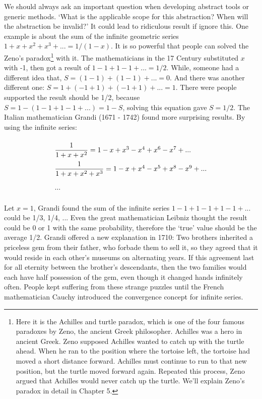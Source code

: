 \documentclass[b5paper]{article}
\begin{document}
We should always ask an important question when developing abstract tools or generic methods. `What is the applicable scope for this abstraction? When will the abstraction be invalid?' It could lead to ridiculous result if ignore this. One example is about the sum of the infinite geometric series $1 + x + x^2 + x^3 + ... = 1/(1-x)$. It is so powerful that people can solved the Zeno's paradox\footnote{Here it is the Achilles and turtle paradox, which is one of the four famous paradoxes by Zeno, the ancient Greek philosopher. Achilles was a hero in ancient Greek. Zeno supposed Achilles wanted to catch up with the turtle ahead. When he ran to the position where the tortoise left, the tortoise had moved a short distance forward. Achilles must continue to run to that new position, but the turtle moved forward again. Repeated this process, Zeno argued that Achilles would never catch up the turtle. We'll explain Zeno's paradox in detail in Chapter 5.} with it. The mathematicians in the 17 Century substituted $x$ with -1, then got a result of $1 - 1 + 1 - 1 + ... = 1/2$. While, someone had a different idea that, $S = (1 - 1) + (1 - 1)+ ... = 0$. And there was another different one: $S = 1 + (-1 + 1) + (-1 + 1) + ... = 1$. There were people supported the result should be 1/2, because $S = 1 - (1 - 1 + 1 - 1 + ...) = 1 -S$, solving this equation gave $S = 1/2$. The Italian mathematician Grandi (1671 - 1742) found more surprising results. By using the infinite series:

\[
\def\arraystretch{2.2}
\begin{array}{l}
\dfrac{1}{1 + x + x^2} = 1 - x + x^3 - x^4 + x^6 - x^7 + ... \\%
\dfrac{1}{1 + x + x^2 + x^3} = 1 - x + x^4 - x^5 + x^8 - x^9 + ... \\
...
\end{array}
\]

Let $x = 1$, Grandi found the sum of the infinite series $1 - 1 + 1 - 1 + 1 - 1 + ...$ could be 1/3, 1/4, ... Even the great mathematician Leibniz thought the result could be 0 or 1 with the same probability, therefore the `true' value should be the average 1/2. Grandi offered a new explanation in 1710: Two brothers inherited a priceless gem from their father, who forbade them to sell it, so they agreed that it would reside in each other's museums on alternating years. If this agreement last for all eternity between the brother's descendants, then the two families would each have half possession of the gem, even though it changed hands infinitely often\cite{HanXueTao16}. People kept suffering from these strange puzzles until the French mathematician Cauchy introduced the convergence concept for infinite series.
\end{document}
